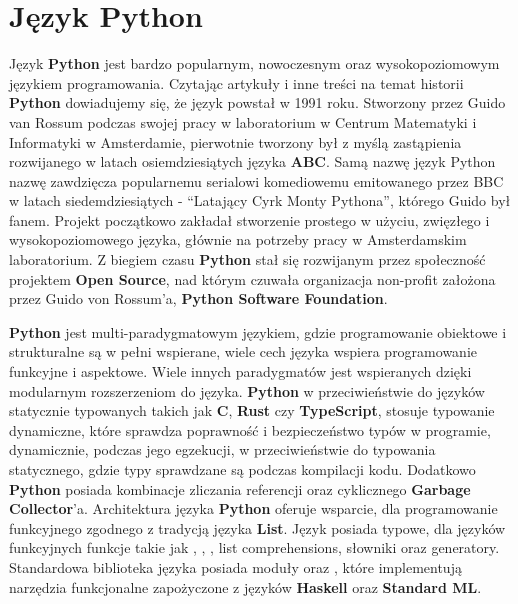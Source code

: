 


\section{Język Python}
Język \textbf{Python} jest bardzo popularnym, nowoczesnym oraz wysokopoziomowym językiem programowania. Czytając artykuły i inne treści na temat historii \textbf{Python} \cite{HistoriaPythona} \cite{WikiepdiaPythonProgrammingLanauge} dowiadujemy się, że język powstał w 1991 roku. Stworzony przez Guido van Rossum podczas swojej pracy w laboratorium w Centrum Matematyki i Informatyki w Amsterdamie, pierwotnie tworzony był z myślą zastąpienia rozwijanego w latach osiemdziesiątych języka \textbf{ABC}. Samą nazwę język Python nazwę zawdzięcza popularnemu serialowi komediowemu emitowanego przez BBC w latach siedemdziesiątych - ``Latający Cyrk Monty Pythona'', którego Guido był fanem.
Projekt początkowo zakładał stworzenie prostego w użyciu, zwięzłego i wysokopoziomowego języka, głównie na potrzeby pracy w Amsterdamskim laboratorium. Z biegiem czasu \textbf{Python} stał się rozwijanym przez społeczność projektem \textbf{Open Source}, nad którym czuwała organizacja non-profit założona przez Guido von Rossum'a, \textbf{Python Software Foundation}.

\textbf{Python} jest multi-paradygmatowym językiem, gdzie programowanie obiektowe i strukturalne są w pełni wspierane, wiele cech języka wspiera programowanie funkcyjne i aspektowe. Wiele innych paradygmatów jest wspieranych dzięki modularnym rozszerzeniom do języka.
\textbf{Python} w przeciwieństwie do języków statycznie typowanych takich jak \textbf{C}, \textbf{Rust} czy \textbf{TypeScript}, stosuje typowanie dynamiczne, które sprawdza poprawność i bezpieczeństwo typów w programie, dynamicznie, podczas jego egzekucji, w przeciwieństwie do typowania statycznego, gdzie typy sprawdzane są podczas kompilacji kodu. Dodatkowo \textbf{Python} posiada kombinacje zliczania referencji oraz cyklicznego \textbf{Garbage Collector}'a.
Architektura języka \textbf{Python} oferuje wsparcie, dla programowanie funkcyjnego zgodnego z tradycją języka \textbf{List}. Język posiada typowe, dla języków funkcyjnych funkcje takie jak , , , list comprehensions, słowniki oraz generatory. Standardowa biblioteka języka posiada moduły  oraz , które implementują narzędzia funkcjonalne zapożyczone z języków \textbf{Haskell} oraz \textbf{Standard ML}.

